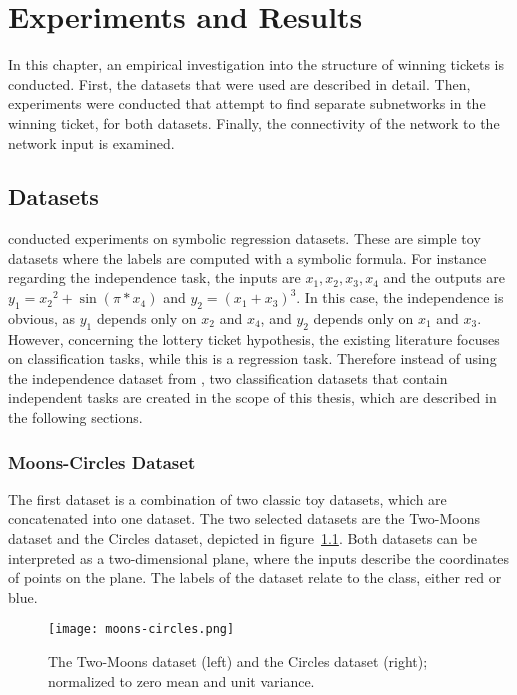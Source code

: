 \chapter{Experiments and Results}\label{chapter:experiments} 
In this chapter, an empirical investigation into the structure of winning tickets is conducted.
First, the datasets that were used are described in detail.
Then, experiments were conducted that attempt to find separate subnetworks in the winning ticket, for both datasets.
Finally, the connectivity of the network to the network input is examined.

\section{Datasets}
\textcite{BIMT} conducted experiments on symbolic regression datasets.
These are simple toy datasets where the labels are computed with a symbolic formula. 
For instance regarding the independence task, the inputs are $x_1, x_2, x_3, x_4$ and the outputs are $y_1={x_2}^2 + \sin{(\pi*x_4)}$ and $y_2={(x_1+x_3)}^3$.
In this case, the independence is obvious, as $y_1$ depends only on $x_2$ and $x_4$, and $y_2$ depends only on $x_1$ and $x_3$.
However, concerning the lottery ticket hypothesis, the existing literature focuses on classification tasks, while this is a regression task.
Therefore instead of using the independence dataset from \autocite{BIMT}, 
two classification datasets that contain independent tasks are created in the scope of this thesis, which are described in the following sections.

\subsection{Moons-Circles Dataset}\label{sec:independece_dataset}
The first dataset is a combination of two classic toy datasets, which are concatenated into one dataset.
The two selected datasets are the Two-Moons dataset and the Circles dataset, depicted in figure~\ref{fig:moons_circles}.
Both datasets can be interpreted as a two-dimensional plane, where the inputs describe the coordinates of points on the plane. 
The labels of the dataset relate to the class, either red or blue.

\begin{figure}
\centering \texttt{[image: moons-circles.png]}
\caption[Two-Moons and Circles Dataset]{
    The Two-Moons dataset (left) and the Circles dataset (right); normalized to zero mean and unit variance.}\label{fig:moons_circles}
\end{figure}

